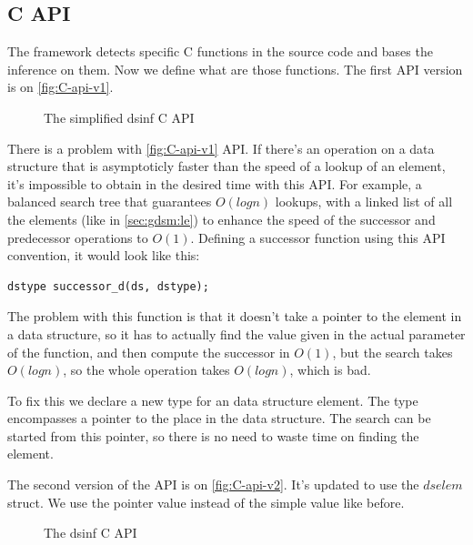 \documentclass[a4paper,11pt]{article}
\begin{document}
	\subsection{C API}
        The framework detects specific C functions in the source code and bases the inference on them. Now we define
        what are those functions. The first API version is on \autoref{fig:C-api-v1}.

        \begin{figure}[h!]
            

            \caption{The simplified dsinf C API}

            \label{fig:C-api-v1}
        \end{figure}

        There is a problem with \autoref{fig:C-api-v1} API. If there's an
        operation on a data structure that is asymptoticly faster than the
        speed of a lookup of an element, it's impossible to obtain in the
        desired time with this API. For example, a balanced search tree
        that guarantees $O(log n)$ lookups, with a linked list of all the
        elements (like in \autoref{sec:gdsm:le}) to enhance the speed of the
        successor and predecessor operations to $O(1)$. Defining a successor
        function using this API convention, it would look like this:

        \begin{lstlisting}
dstype successor_d(ds, dstype);
        \end{lstlisting}

        The problem with this function is that it doesn't take a pointer to the element in a data structure, so it has
        to actually find the value given in the actual parameter of the function, and then compute the successor in
        $O(1)$, but the search takes $O(log n)$, so the whole operation takes $O(log n)$, which is bad.

        To fix this we declare a new type for an data structure element. The type encompasses a pointer to the place in
        the data structure. The search can be started from this pointer, so there is no need to waste time on finding the element.

        The second version of the API is on \autoref{fig:C-api-v2}. It's updated to use the $dselem$ struct. We use the pointer value instead of the simple value like before.

        \begin{figure}[h!]
            
            \caption{The dsinf C API}

            \label{fig:C-api-v2}
        \end{figure}
\end{document}
